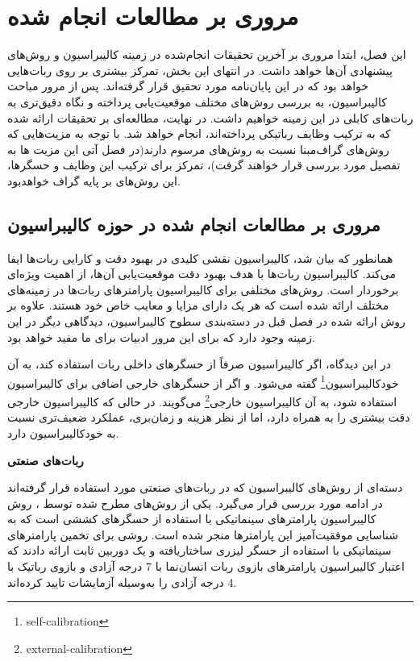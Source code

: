 \chapter{مروری بر مطالعات انجام شده}
این فصل، ابتدا مروری بر آخرین تحقیقات انجام‌شده در زمینه کالیبراسیون و روش‌های پیشنهادی آن‌ها خواهد داشت. در انتهای این بخش، تمرکز بیشتری بر روی ربات‌هایی خواهد بود که در این پایان‌نامه مورد تحقیق قرار گرفته‌اند. پس از مرور مباحث کالیبراسیون، به بررسی روش‌های مختلف موقعیت‌یابی پرداخته و نگاه دقیق‌تری به ربات‌های کابلی در این زمینه خواهیم داشت. در نهایت، مطالعه‌ای بر تحقیقات ارائه شده که به ترکیب وظایف رباتیکی پرداخته‌اند، انجام خواهد شد. با توجه به مزیت‌هایی که روش‌های گراف‌مبنا نسبت به روش‌های مرسوم دارند(در فصل آتی این مزیت ها به تفصیل مورد بررسی قرار خواهند گرفت)، تمرکز برای ترکیب این وظایف و حسگرها، این روش‌های بر پایه گراف خواهدبود. 

\section{مروری بر مطالعات انجام شده در حوزه کالیبراسیون} 



همانطور که بیان شد، کالیبراسیون نقشی کلیدی در بهبود دقت و کارایی ربات‌ها ایفا می‌کند. کالیبراسیون ربات‌ها با هدف بهبود دقت موقعیت‌یابی آن‌ها، از اهمیت ویژه‌ای برخوردار است. روش‌های مختلفی برای کالیبراسیون پارامترهای ربات‌ها در زمینه‌های مختلف ارائه شده است که هر یک دارای مزایا و معایب خاص خود هستند. علاوه بر روش ارائه شده در فصل قبل در دسته‌بندی سطوح کالیبراسیون، دیدگاهی دیگر در این زمینه وجود دارد که برای این مرور ادبیات برای ما مفید خواهد بود.

در این دیدگاه، اگر کالیبراسیون صرفاً از حسگرهای داخلی ربات استفاده کند، به آن خودکالیبراسیون\footnote{self-calibration} گفته می‌شود. و اگر از حسگر‌های خارجی اضافی برای کالیبراسیون استفاده شود، به آن کالیبراسیون خارجی\footnote{external-calibration} می‌گویند. در حالی که کالیبراسیون خارجی دقت بیشتری را به همراه دارد، اما از نظر هزینه و زمان‌بری، عملکرد ضعیف‌تری نسبت به خودکالیبراسیون دارد.



\textbf{ربات‌های صنعتی}

 دسته‌ای از روش‌های کالیبراسیون که در ربات‌های صنعتی مورد استفاده قرار گرفته‌اند در ادامه مورد بررسی قرار می‌گیرد. یکی از روش‌های مطرح شده توسط \cite{gan2019calibration}، روش کالیبراسیون پارامترهای سینماتیکی با استفاده از حسگرهای کششی است که به شناسایی موفقیت‌آمیز این پارامترها منجر شده است. \cite{park2011laser} روشی برای تخمین پارامترهای سینماتیکی با استفاده از حسگر لیزری ساختاریافته و یک دوربین ثابت ارائه دادند که اعتبار کالیبراسیون پارامترهای بازوی ربات انسان‌نما با 7 درجه آزادی و بازوی رباتیک با 4 درجه آزادی را به‌وسیله آزمایشات تایید کرده‌اند. 
 
